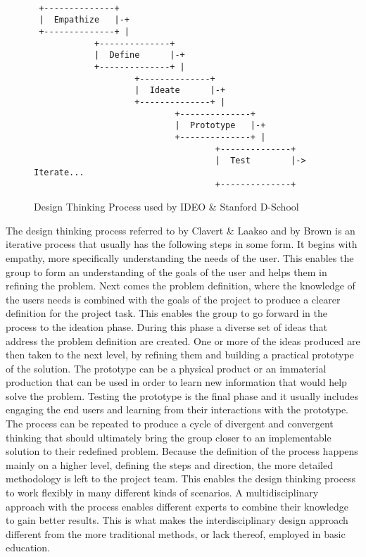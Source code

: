 \documentclass[english,12pt,a4paper,pdftex]{article}
\begin{document}

\begin{figure}[H]
\begin{verbatim}
 
 +--------------+
 |  Empathize   |-+
 +--------------+ |
            +--------------+
            |  Define      |-+
            +--------------+ |
                    +--------------+
                    |  Ideate      |-+
                    +--------------+ |
                            +--------------+
                            |  Prototype   |-+
                            +--------------+ |
                                    +--------------+
                                    |  Test        |-> Iterate...
                                    +--------------+
\end{verbatim}
\caption{Design Thinking Process used by IDEO \& Stanford D-School}
\label{fig:dt-process}
\end{figure}

The design thinking process referred to by Clavert \& Laakso \cite{Clavert} and by Brown \cite{Brown} is an iterative process that usually has the following steps in some form. It begins with empathy, more specifically understanding the needs of the user. This enables the group to form an understanding of the goals of the user and helps them in refining the problem. Next comes the problem definition, where the knowledge of the users needs is combined with the goals of the project to produce a clearer definition for the project task. This enables the group to go forward in the process to the ideation phase. During this phase a diverse set of ideas that address the problem definition are created. One or more of the ideas produced are then taken to the next level, by refining them and building a practical prototype of the solution. The prototype can be a physical product or an immaterial production that can be used in order to learn new information that would help solve the problem. Testing the prototype is the final phase and it usually includes engaging the end users and learning from their interactions with the prototype. \cite{Clavert,Brown} The process can be repeated to produce a cycle of divergent and convergent thinking that should ultimately bring the group closer to an implementable solution to their redefined problem. Because the definition of the process happens mainly on a higher level, defining the steps and direction, the more detailed methodology is left to the project team. This enables the design thinking process to work flexibly in many different kinds of scenarios. A multidisciplinary approach with the process enables different experts to combine their knowledge to gain better results. This is what makes the interdisciplinary design approach different from the more traditional methods, or lack thereof, employed in basic education.
\end{document}
